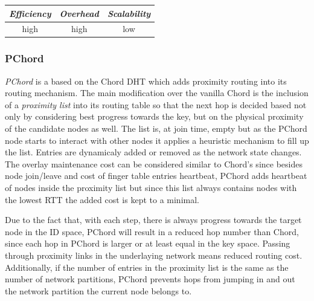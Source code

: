 \begin{center}
\begin{tabular}{ccc}
\emph{Efficiency} & \emph{Overhead} & \emph{Scalability} \\
\hline
high &
high &
low
\end{tabular}
\end{center}

\subsubsection{PChord}
\emph{PChord}\cite{hong_pchord_2005} is a based on the Chord DHT which adds
proximity routing into its routing mechanism. The main modification over the
vanilla Chord is the inclusion of a \emph{proximity list} into its routing table
so that the next hop is decided based not only by considering best progress
towards the key, but on the physical proximity of the candidate nodes as well.
The list is, at join time, empty but as the PChord node starts to interact with
other nodes it applies a heuristic mechanism to fill up the list. Entries are
dynamicaly added or removed as the network state changes. The overlay
maintenance cost can be considered similar to Chord's since besides node
join/leave and cost of finger table entries heartbeat, PChord adds heartbeat of
nodes inside the proximity list but since this list always contains nodes with
the lowest RTT the added cost is kept to a minimal.

Due to the fact that, with each step, there is always progress towards the
target node in the ID space, PChord will result in a reduced hop number than
Chord, since each hop in PChord is larger or at least equal in the key space.
Passing through proximity links in the underlaying network means reduced routing
cost. Additionally, if the number of entries in the proximity list is the same
as the number of network partitions, PChord prevents hops from jumping in and
out the network partition the current node belongs to.


